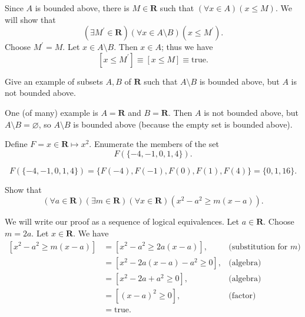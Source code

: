 \documentclass[12pt,fleqn]{exam}
\newcommand{\reals}{\mathbf{R}}
\newcommand{\true}{\mbox{true}}
\begin{document}
\begin{questions}
\begin{solution}
  Since $A$ is bounded above, there is $M \in \reals$ such that
  $(\forall x \in A)(x \leq M)$.  We will show that
  \[
    (\exists M^\prime \in \reals)(\forall x \in A \setminus B)(x \leq M^\prime).
  \]
  Choose $M^\prime= M$. Let $x \in A \setminus B$. Then $x \in A$; thus we have
  \[
     [x \leq M^\prime]  \equiv [x \leq M] \equiv \true.
  \]


\end{solution}

\question Give an example of subsets $A,B$ of $\reals$
such that $A \setminus B$ is bounded above, but $A$ is not bounded
above.

\begin{solution}
  One (of many) example is $A = \reals$ and $B = \reals$. Then
  $A$ is not bounded above, but $A \setminus B = \varnothing$,
  so  $A \setminus B$ is bounded above (because the empty set is bounded above).
\end{solution}

\question Define $F = x \in \reals \mapsto x^2$.  Enumerate the members of the set
\begin{equation*}
  F(\{-4,-1,0,1,4 \}).
\end{equation*}
\begin{solution}
  \[
    F(\{-4,-1,0,1,4 \}) = \{F(-4),F(-1),F(0),F(1),F(4) \} =
     \{0,1,16\}.
  \]
\end{solution}


\question Show that
\[
    \left(\forall a \in \reals \right) \left(\exists m \in \reals \right)
    \left(\forall x \in \reals \right) \left(x^2 - a^2 \geq m (x-a) \right).
\]
\begin{solution}
  We will write our proof as a sequence of logical 
  equivalences.   Let $a \in \reals$. Choose $m = 2 a$. Let $x \in \reals$. We have
  \begin{align*}
    \left [x^2 - a^2 \geq m (x-a) \right ] &=
    \left [x^2 - a^2 \geq 2a  (x-a) \right ], &\mbox{(substitution for $m$)} \\
    &=
    \left [x^2 -2 a (x-a) - a^2 \geq 0 \right ],  &\mbox{(algebra)}\\
    &=
    \left [x^2 -2 a  + a^2 \geq 0 \right ], &\mbox{(algebra)} \\
    &=
    \left [(x - a)^2 \geq 0 \right ], &\mbox{(factor)} \\
    &=
    \true.
  \end{align*}
  
 
\end{solution}

\end{questions}
\end{document}
